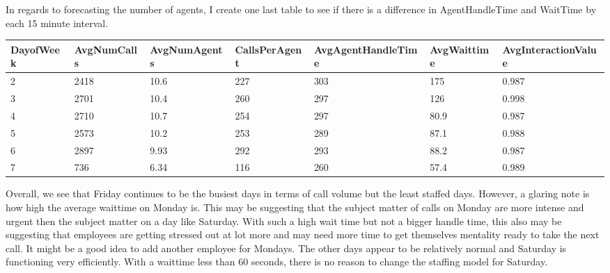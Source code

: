 \documentclass[12pt]{article}
\begin{document}
In regards to forecasting the number of agents, I create one last table to see if there is a difference in AgentHandleTime and WaitTime
by each 15 minute interval.
\begin{table}[H]
  \resizebox{\textwidth}{!} {
  \begin{tabular}{ l | l | l | l | l | l | l |}
    {\bf DayofWeek} & {\bf AvgNumCalls} & {\bf AvgNumAgents} & {\bf CallsPerAgent} & {\bf AvgAgentHandleTime} & {\bf AvgWaittime} & {\bf AvgInteractionValue}\\
  \hline
  2 & 2418 & 10.6 & 227 & 303 & 175 & 0.987 \\
  \hline
  3 & 2701 & 10.4 & 260 & 297 & 126 & 0.998\\
  \hline
  4 & 2710 & 10.7 & 254 & 297 & 80.9 & 0.987 \\
  \hline
  5 & 2573 & 10.2 & 253 & 289 & 87.1 & 0.988 \\
  \hline
  6 & 2897 & 9.93 & 292 & 293 & 88.2 & 0.987 \\
  \hline
  7 & 736 & 6.34 & 116 & 260 & 57.4 & 0.989\\
  \end{tabular}
  }
  \end{table}
Overall, we see that Friday continues to be the busiest days in terms of call volume but the least staffed days. However, a glaring note
is how high the average waittime on Monday is. This may be suggesting that the subject matter of calls on Monday are more intense and urgent
then the subject matter on a day like Saturday. With such a high wait time but not a bigger handle time, this also may be suggesting that
employees are getting stressed out at lot more and may need more time to get themselves mentality ready to take the next call. It might be a good idea to add another employee for Mondays. 
The other days appear to be relatively normal and Saturday is functioning very efficiently. With a waittime less than 60 seconds, there is no reason to change the staffing model for
Saturday. 
\end{document}
